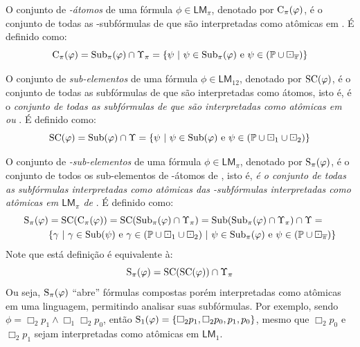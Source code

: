             \begin{definicao}
                \label{def:FuncoesElementos}
                O conjunto de \textit{\PI-átomos} de uma fórmula \(\phi \in \mathsf{LM}_\pi\), denotado por \(\operatorname{C}_\pi(\varphi)\), é o conjunto de todas as \PI-subfórmulas de
                \PHI que são interpretadas como atômicas em \linguagem{\pi}. É definido como:
                \[
                    \operatorname{C}_\pi(\varphi) = \operatorname{Sub}_\pi(\varphi) \cap \Upsilon_\pi = \{\psi \ | \ \psi \in \operatorname{Sub}_{\pi}(\varphi) \text{ e }
                        \psi \in (\mathbb{P} \cup \boxdot_{\overline{\pi}})\}
                \]

                O conjunto de \textit{sub-elementos} de uma fórmula \(\phi \in \mathsf{LM}_{12}\), denotado por \(\operatorname{SC}(\varphi)\), é o conjunto de todas as subfórmulas de \PHI
                que são interpretadas como átomos, isto é, é o \textit{conjunto de todas as subfórmulas de \PHI que são interpretadas como atômicas em \linguagem{\pi} ou
                \linguagem{\mOPI}}. É definido como:
                \[
                    \operatorname{SC}(\varphi) = \operatorname{Sub}(\varphi) \cap \Upsilon = \{\psi \ | \ \psi \in \operatorname{Sub}(\varphi) \text{ e } \psi \in (\mathbb{P} \cup \boxdot_{1} \cup \boxdot_{2})\}
                \]

                O conjunto de \textit{\PI-sub-elementos} de uma fórmula \(\phi \in \mathsf{LM}_\pi\), denotado por \(\operatorname{S}_\pi(\varphi)\), é o conjunto de todos os sub-elementos de
                \PI-átomos de \PHI, isto é, \textit{é o conjunto de todas as subfórmulas interpretadas como atômicas das \PI-subfórmulas interpretadas como atômicas
                em \(\mathsf{LM}_\pi\) de \PHI}. É definido como:
                \begin{align*}
                    \operatorname{S}_\pi(\varphi) &= \operatorname{SC}(\operatorname{C}_\pi(\varphi)) = \operatorname{SC}(\operatorname{Sub}_\pi(\varphi) \cap \Upsilon_\pi) = \operatorname{Sub}(\operatorname{Sub}_\pi(\varphi) \cap \Upsilon_\pi) \cap \Upsilon = \\
                    &\{\gamma \ | \ \gamma \in \operatorname{Sub}(\psi) \text{ e } \gamma \in (\mathbb{P} \cup \boxdot_{1} \cup \boxdot_{2}) \ | \
                        \psi \in \operatorname{Sub}_{\pi}(\varphi) \text{ e } \psi \in (\mathbb{P} \cup \boxdot_{\overline{\pi}})\}
                \end{align*}
                Note que está definição é equivalente à:
                \[
                    \operatorname{S}_\pi(\varphi) = \operatorname{SC}(\operatorname{SC}(\varphi)) \cap \Upsilon_\pi
                \]
                Ou seja, \(\operatorname{S}_\pi(\varphi)\) ``abre'' fórmulas compostas porém interpretadas como atômicas em uma linguagem, permitindo analisar suas subfórmulas.
                Por exemplo, sendo \(\phi = \Box_{2} p_{1} \land \Box_{1} \Box_{2} p_{0}\), então \(\operatorname{S}_{1}(\varphi) = \{\Box_{2} p_{1}, \Box_{2} p_{0}, p_{1}, p_{0}\}\), mesmo
                que \(\Box_{2} p_{0}\) e \(\Box_{2} p_{1}\) sejam interpretadas como atômicas em \(\mathsf{LM}_{1}\).


\end{definicao}
